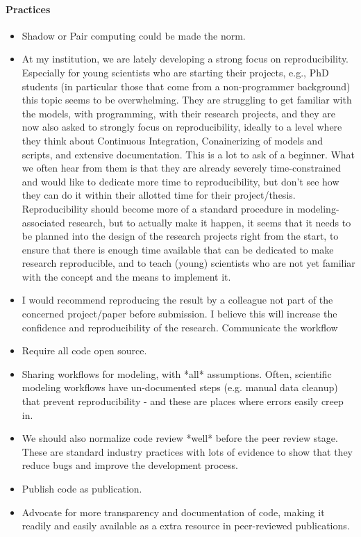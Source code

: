 \documentclass{article}
\begin{document}
\paragraph{Practices}
\begin{itemize}
	\item Shadow or Pair computing could be made the norm.
	\item At my institution, we are lately developing a strong focus on reproducibility. Especially for young scientists who are starting their projects, e.g., PhD students (in particular those that come from a non-programmer background) this topic seems to be overwhelming. They are struggling to get familiar with the models, with programming, with their research projects, and they are now also asked to strongly focus on reproducibility, ideally to a level where they think about Continuous Integration, Conainerizing of models and scripts, and extensive documentation. This is a lot to ask of a beginner. What we often hear from them is that they are already severely time-constrained and would like to dedicate more time to reproducibility, but don't see how they can do it within their allotted time for their project/thesis. Reproducibility should become more of a standard procedure in modeling-associated research, but to actually make it happen, it seems that it needs to be planned into the design of the research projects right from the start, to ensure that there is enough time available that can be dedicated to make research reproducible, and to teach (young) scientists who are not yet familiar with the concept and the means to implement it.
	\item I would recommend reproducing the result by a colleague not part of the concerned project/paper before submission. I believe this will increase the confidence and reproducibility of the research. 
Communicate the workflow
	\item Require all code open source.
	\item Sharing workflows for modeling, with *all* assumptions. Often, scientific modeling workflows have un-documented steps (e.g. manual data cleanup) that prevent reproducibility - and these are places where errors easily creep in.
	\item We should also normalize code review *well* before the peer review stage. These are standard industry practices with lots of evidence to show that they reduce bugs and improve the development process.
	\item Publish code as publication.
	\item Advocate for more transparency and documentation of code, making it readily and easily available as a extra resource in peer-reviewed publications.

\end{itemize}
\end{document}
